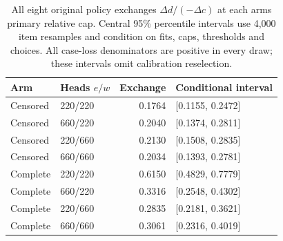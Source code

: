 \begin{table}[t]\centering\small
\caption{All eight original policy exchanges $\Delta d/(-\Delta c)$ at each arm\textquotesingle s primary relative cap. Central 95\% percentile intervals use 4,000 item resamples and condition on fits, caps, thresholds and choices. All case-loss denominators are positive in every draw; these intervals omit calibration reselection.}\label{tab:v8-exchange}
\begin{tabular}{llrl}\toprule
Arm & Heads $e/w$ & Exchange & Conditional interval\\\midrule
Censored & 220/220 & 0.1764 & [0.1155, 0.2472] \\
Censored & 660/220 & 0.2040 & [0.1374, 0.2811] \\
Censored & 220/660 & 0.2130 & [0.1508, 0.2835] \\
Censored & 660/660 & 0.2034 & [0.1393, 0.2781] \\
Complete & 220/220 & 0.6150 & [0.4829, 0.7779] \\
Complete & 660/220 & 0.3316 & [0.2548, 0.4302] \\
Complete & 220/660 & 0.2835 & [0.2181, 0.3621] \\
Complete & 660/660 & 0.3061 & [0.2316, 0.4019] \\
\bottomrule\end{tabular}\end{table}
